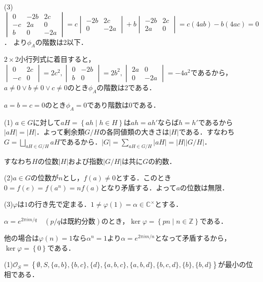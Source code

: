 \documentclass[
		book,
		head_space=20mm,
		foot_space=20mm,
		gutter=10mm,
		line_length=190mm
]{jlreq}
\begin{document}
(3) $\begin{vmatrix}
    0 & -2b & 2c \\
    -c & 2a & 0 \\
    b & 0 & -2a
\end{vmatrix}=c\begin{vmatrix}
    -2b & 2c \\
    0 & -2a
\end{vmatrix}+b\begin{vmatrix}
    -2b & 2c \\
    2a & 0
\end{vmatrix}=c(4ab)-b(4ac)=0$．
より$\phi_A$の階数は2以下．

$2\times 2$小行列式に着目すると，$\begin{vmatrix}
    0 & 2c \\
    -c & 0
    \end{vmatrix}=2c^2, 
    \begin{vmatrix}
        0 & -2b \\
        b & 0
    \end{vmatrix}=2b^2,
    \begin{vmatrix}
        2a & 0 \\
        0 & -2a
    \end{vmatrix}=-4a^2$であるから，$a\neq 0 \vee b\neq 0 \vee c\neq 0$のとき$\phi_A$の階数は2である．

    $a=b=c=0$のとき$\phi_A=0$であり階数は0である．


(1)
$a\in G$に対して$aH=\left\{ ah \mid h \in H \right\}$は$ah=ah'$ならば$h=h'$であるから$|aH|=|H|$．よって剰余類$G/H$の各同値類の大きさは$|H|$である．すなわち$G=\bigsqcup\limits_{aH \in G/H} aH$であるから．$|G|=\sum\limits_{aH \in G/H} |aH|=|H||G/H|$．

すなわち$H$の位数$|H|$および指数$|G/H|$は共に$G$の約数．

(2)$a\in G$の位数が$n$とし，$f(a)\neq 0$とする．このとき$0=f(e)=f(a^n)=nf(a)$となり矛盾する．よって$a$の位数は無限．

(3)$\varphi$は$1$の行き先で定まる．$1\neq \varphi(1)=\alpha\in \mathbb{C}^{\times}$とする．

$\alpha=e^{2\pi i m/q}\quad(p/q\text{は既約分数})$のとき，$\ker \varphi = \left\{ pn \mid n\in \mathbb{Z} \right\}$である．

他の場合は$\varphi(n)=1$なら$\alpha^n=1$より$\alpha=e^{2\pi i m/n}$となって矛盾するから，$\ker \varphi = \left\{ 0 \right\}$である．

(1)$\mathcal{O}_S=\left\{ \emptyset,S,\{ a,b \},\{b,c\},\{ d \}, \{ a,b,c \},\{ a,b,d \},\{b,c,d\},\{ b\} ,\{b,d\}\right\}$が最小の位相である．
\end{document}
